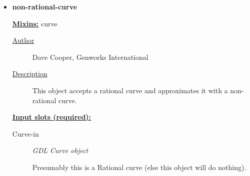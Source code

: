 \documentclass [11pt]{book}
\begin{document}
\begin{itemize}







\item {}
\label{prim:non-rational-curve}
\textbf{non-rational-curve}


\textbf{
\underline{Mixins:}} curve





\begin{description}

\item [
\underline{Author}]


Dave Cooper, Genworks International



\item [
\underline{Description}]


This object accepts a rational curve and approximates it with a non-rational curve.



\end{description}








\textbf{
\underline{Input slots (required):}}

\begin{description}

\item [Curve-in]
\emph{GDL Curve object}

 Presumably this is a Rational curve (else this object will do nothing).





\end{description}
\end{itemize}
\end{document}
